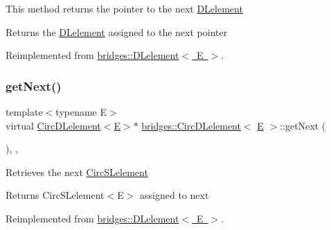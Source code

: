 This method returns the pointer to the next \mbox{\hyperlink{classbridges_1_1_d_lelement}{D\+Lelement}} \begin{DoxyReturn}{Returns}
the \mbox{\hyperlink{classbridges_1_1_d_lelement}{D\+Lelement}} assigned to the next pointer 
\end{DoxyReturn}


Reimplemented from \mbox{\hyperlink{classbridges_1_1_d_lelement_a648012849263b4b1cd2d504d5e5fd880}{bridges\+::\+D\+Lelement$<$ E $>$}}.

\mbox{\label{classbridges_1_1_circ_d_lelement_a52996d42efc5680d1f8b406143abfee5}} 
\subsubsection{\texorpdfstring{getNext()}{getNext()}\hspace{0.1cm}{\footnotesize\ttfamily [2/2]}}
{\footnotesize\ttfamily template$<$typename E$>$ \\
virtual \mbox{\hyperlink{classbridges_1_1_circ_d_lelement}{Circ\+D\+Lelement}}$<$\mbox{\hyperlink{namespacebridges_acfb0a4f7877d8f63de3e6862004c50eda3a3ea00cfc35332cedf6e5e9a32e94da}{E}}$>$$\ast$ \mbox{\hyperlink{classbridges_1_1_circ_d_lelement}{bridges\+::\+Circ\+D\+Lelement}}$<$ \mbox{\hyperlink{namespacebridges_acfb0a4f7877d8f63de3e6862004c50eda3a3ea00cfc35332cedf6e5e9a32e94da}{E}} $>$\+::get\+Next (\begin{DoxyParamCaption}{ }\end{DoxyParamCaption})\hspace{0.3cm}{\ttfamily [inline]}, {\ttfamily [override]}, {\ttfamily [virtual]}}

Retrieves the next \mbox{\hyperlink{classbridges_1_1_circ_s_lelement}{Circ\+S\+Lelement}} \begin{DoxyReturn}{Returns}
Circ\+S\+Lelement$<$\+E$>$ assigned to next 
\end{DoxyReturn}


Reimplemented from \mbox{\hyperlink{classbridges_1_1_d_lelement_a0c713707d8c7d0a97fe4194ed6592ede}{bridges\+::\+D\+Lelement$<$ E $>$}}.

\mbox{\label{classbridges_1_1_circ_d_lelement_a8a1aa2f979094bccf2cca2ca31f0373d}} 
